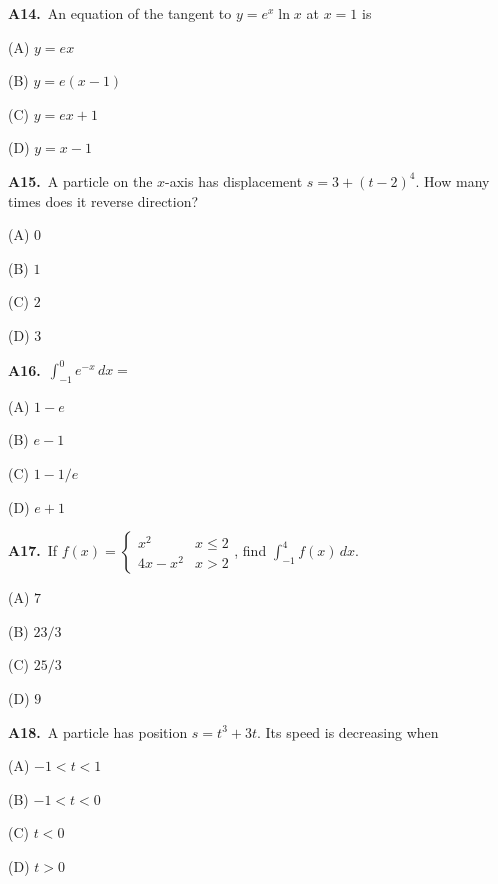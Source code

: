 \documentclass[11pt]{article}
\begin{document}
\bigskip\noindent\textbf{A14.}\ An equation of the tangent to $y=e^x\ln x$ at $x=1$ is
\begin{list}{}{\setlength{\leftmargin}{3em}\setlength{\labelwidth}{2.5em}\setlength{\itemsep}{0pt}\setlength{\topsep}{2pt}}
\item[(A)] $y=ex$
\item[(B)] $y=e(x-1)$
\item[(C)] $y=ex+1$
\item[(D)] $y=x-1$
\end{list}

\bigskip\noindent\textbf{A15.}\ A particle on the $x$-axis has displacement $s=3+(t-2)^4$. How many times does it reverse direction?
\begin{list}{}{\setlength{\leftmargin}{3em}\setlength{\labelwidth}{2.5em}\setlength{\itemsep}{0pt}\setlength{\topsep}{2pt}}
\item[(A)] $0$
\item[(B)] $1$
\item[(C)] $2$
\item[(D)] $3$
\end{list}

\bigskip\noindent\textbf{A16.}\ $\int_{-1}^0 e^{-x}\,dx=$
\begin{list}{}{\setlength{\leftmargin}{3em}\setlength{\labelwidth}{2.5em}\setlength{\itemsep}{0pt}\setlength{\topsep}{2pt}}
\item[(A)] $1-e$
\item[(B)] $e-1$
\item[(C)] $1-1/e$
\item[(D)] $e+1$
\end{list}

\bigskip\noindent\textbf{A17.}\ If $f(x)=\begin{cases}x^2&x\le2\\4x-x^2&x>2\end{cases}$, find $\int_{-1}^4f(x)\,dx$.
\begin{list}{}{\setlength{\leftmargin}{3em}\setlength{\labelwidth}{2.5em}\setlength{\itemsep}{0pt}\setlength{\topsep}{2pt}}
\item[(A)] $7$
\item[(B)] $23/3$
\item[(C)] $25/3$
\item[(D)] $9$
\end{list}

\bigskip\noindent\textbf{A18.}\ A particle has position $s=t^3+3t$. Its speed is decreasing when
\begin{list}{}{\setlength{\leftmargin}{3em}\setlength{\labelwidth}{2.5em}\setlength{\itemsep}{0pt}\setlength{\topsep}{2pt}}
\item[(A)] $-1<t<1$
\item[(B)] $-1<t<0$
\item[(C)] $t<0$
\item[(D)] $t>0$
\end{list}
\end{document}
